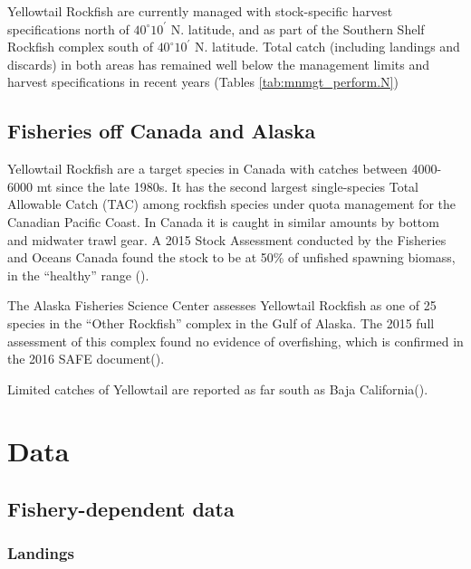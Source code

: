 \documentclass[
]{scrartcl}
\begin{document}
Yellowtail Rockfish are currently managed with stock-specific harvest
specifications north of \(40^\circ 10^\prime\) N. latitude, and as part
of the Southern Shelf Rockfish complex south of \(40^\circ 10^\prime\)
N. latitude. Total catch (including landings and discards) in both areas
has remained well below the management limits and harvest specifications
in recent years (Tables \ref{tab:mnmgt_perform.N})

\subsection{Fisheries off Canada and
Alaska}\label{fisheries-off-canada-and-alaska}

Yellowtail Rockfish are a target species in Canada with catches between
4000-6000 mt since the late 1980s. It has the second largest
single-species Total Allowable Catch (TAC) among rockfish species under
quota management for the Canadian Pacific Coast. In Canada it is caught
in similar amounts by bottom and midwater trawl gear. A 2015 Stock
Assessment conducted by the Fisheries and Oceans Canada found the stock
to be at 50\% of unfished spawning biomass, in the ``healthy'' range
().

The Alaska Fisheries Science Center assesses Yellowtail Rockfish as one
of 25 species in the ``Other Rockfish'' complex in the Gulf of Alaska.
The 2015 full assessment of this complex found no evidence of
overfishing, which is confirmed in the 2016 SAFE
document().

Limited catches of Yellowtail are reported as far south as Baja
California().

\newpage{}

\section{Data}\label{data}

\subsection{Fishery-dependent data}\label{fishery-dependent-data}

\subsubsection{Landings}\label{landings}
\end{document}
